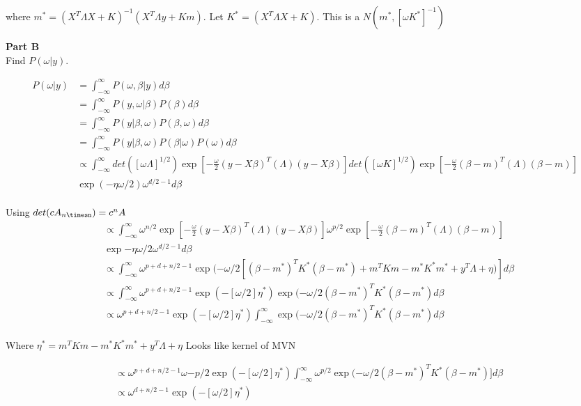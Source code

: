 \documentclass[12pt]{amsart}
\begin{document}
where $m^*=(X^T\Lambda X +K)^{-1}(X^T\Lambda y +Km)$. Let $K^*=(X^T\Lambda X+K)$. This is a $N(m^*, [\omega K^*]^{-1} )$

\bigskip
\bigskip

\textbf{Part B}\\


Find $P(\omega|y)$. 

\begin{align*}
    P(\omega|y) &= \int_{-\infty}^{\infty}  P(\omega, \beta|y)d\beta \\
    &= \int_{-\infty}^{\infty}  P(y, \omega|\beta)P(\beta)d\beta \\
     & =\int_{-\infty}^{\infty} P(y|\beta, \omega)P(\beta, \omega)d\beta \\
     & = \int_{-\infty}^{\infty} P(y|\beta, \omega)P(\beta| \omega)P(\omega)d\beta \\
     & \propto \int_{-\infty}^{\infty}  det([\omega \Lambda]^{1/2} )\exp[-\frac{\omega}{2}(y-X\beta)^T(\Lambda)(y-X \beta) ] det([\omega K]^{1/2} )\exp[-\frac{\omega}{2}(\beta-m)^T(\Lambda)(\beta-m) ]\\ &\exp{(-\eta\omega/2)} \omega^{d/2-1}d\beta
\end{align*}\\

Using $det(cA_{n\timesn})=c^nA$\\

\begin{align*}
  &\propto \int_{-\infty}^{\infty} \omega^{n/2}\exp[-\frac{\omega}{2}(y-X\beta)^T(\Lambda)(y-X \beta) ] \omega^{p/2}\exp[-\frac{\omega}{2}(\beta-m)^T(\Lambda)(\beta-m) ]\\ &\exp{-\eta\omega/2} \omega^{d/2-1}d\beta \\
  & \propto \int_{-\infty}^{\infty} \omega^{p+d+n/2-1}  \exp{(-\omega/2[ (\beta-m^*)^TK^*(\beta-m^*)+m^TKm-m^*K^*m^*+y^T\Lambda + \eta)]}d\beta\\
   & \propto \int_{-\infty}^{\infty} \omega^{p+d+n/2-1} \exp(-[\omega/2]\eta^*) \exp{(-\omega/2
   (\beta-m^*)^TK^*(\beta-m^*)}d\beta \\
     & \propto \omega^{p+d+n/2-1} \exp(-[\omega/2]\eta^*)  \int_{-\infty}^{\infty} \exp{(-\omega/2
   (\beta-m^*)^TK^*(\beta-m^*)}d\beta
\end{align*}\\

Where $\eta^* = m^TKm-m^*K^*m^*+y^T\Lambda + \eta$
Looks like kernel of MVN

\begin{align*}
& \propto \omega^{p+d+n/2-1} \omega{-p/2} \exp(-[\omega/2]\eta^*)  \int_{-\infty}^{\infty} \omega^{p/2} \exp{(-\omega/2
   (\beta-m^*)^TK^*(\beta-m^*)]}d\beta\\
   & \propto  \omega^{d+n/2-1}  \exp(-[\omega/2]\eta^*) 
\end{align*}\\
\end{document}
